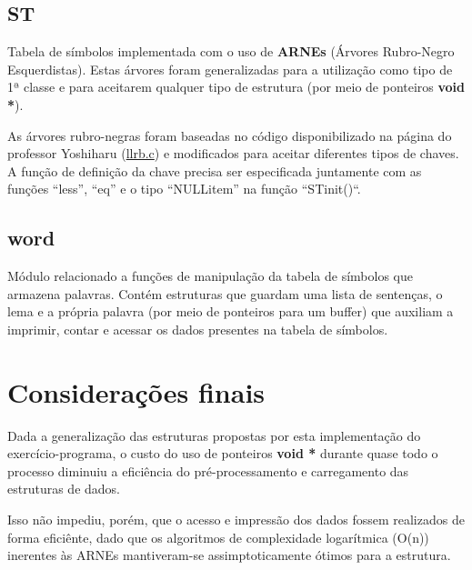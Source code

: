 \documentclass[a4paper,12pt]{article}
\begin{document}
    \subsection{ST} 
        Tabela de símbolos implementada com o uso de \textbf{ARNEs}
        (Árvores Rubro-Negro Esquerdistas). Estas árvores foram
        generalizadas para a utilização como tipo de 1ª classe e para
        aceitarem qualquer tipo de estrutura (por meio de ponteiros 
        \textbf{void *}).

        As árvores rubro-negras foram baseadas no código disponibilizado
        na página do professor Yoshiharu
        (\href{http://www.ime.usp.br/~yoshi/2012i/mac323/exx/LLRB.3/llrb.c}{llrb.c})
        e modificados para aceitar diferentes tipos de chaves. A função de 
        definição da chave precisa ser especificada juntamente com as
        funções ``less'', ``eq'' e o tipo ``NULLitem'' na função 
        ``STinit()``.

    \subsection{word} 
        Módulo relacionado a funções de manipulação da tabela de
        símbolos que armazena palavras. Contém estruturas que guardam
        uma lista de sentenças, o lema e a própria palavra (por meio de 
        ponteiros para um buffer) que auxiliam a imprimir, contar e 
        acessar os dados presentes na tabela de símbolos.

\section{Considerações finais} 
    Dada a generalização das estruturas propostas por esta implementação
    do exercício-programa, o custo do uso de ponteiros \textbf{void *}
    durante quase todo o processo diminuiu a eficiência do
    pré-processamento e carregamento das estruturas de dados.

    Isso não impediu, porém, que o acesso e impressão dos dados fossem
    realizados de forma eficiênte, dado que os algoritmos de
    complexidade logarítmica (O(n)) inerentes às ARNEs mantiveram-se
    assimptoticamente ótimos para a estrutura.
\end{document}
